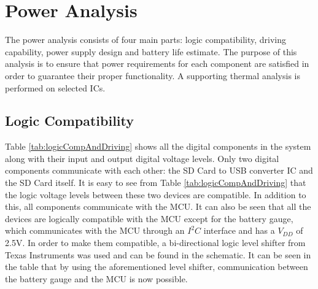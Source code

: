 \section{Power Analysis}
The power analysis consists of four main parts: logic compatibility, driving capability, power supply design and battery life estimate. The purpose of this analysis is to ensure that power requirements for each component are satisfied in order to guarantee their proper functionality. A supporting thermal analysis is performed on selected ICs.

\subsection{Logic Compatibility}

Table \ref{tab:logicCompAndDriving} shows all the digital components in the system along with their input and output digital voltage levels.  Only two digital components communicate with each other: the SD Card to USB converter IC and the SD Card itself.  It is easy to see from Table \ref{tab:logicCompAndDriving} that the logic voltage levels between these two devices are compatible.  In addition to this, all components communicate with the MCU.  It can also be seen that all the devices are logically compatible with the MCU except for the battery gauge, which communicates with the MCU through an $I^2C$ interface and has a $V_{DD}$ of 2.5V.  In order to make them compatible, a bi-directional logic level shifter from Texas Instruments was used and can be found in the schematic.  It can be seen in the table that by using the aforementioned level shifter, communication between the battery gauge and the MCU is now possible.


